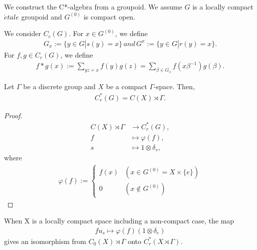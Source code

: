We construct the C*-algebra from a groupoid.
We assume $G$ is a locally compact $\acute{e}tale$ groupoid and $G^{(0)}$ is compact open.

We consider $C_c(G)$.
For $x \in G^{(0)}$, we define
\begin{align*}
  G_x := \{y \in G|s(y)=x\} \,and\, G^x := \{y \in G|r(y)=x\}.
\end{align*}
For $f ,g \in C_c(G)$, we define
\begin{align*}
  f*g(x) := \sum_{yz = x}f(y)g(z) = \sum_{\beta \in G_x}f(x\beta^{-1})g(\beta).
\end{align*}

\begin{proposition}
  Let $\Gamma$ be a discrete group and $X$ be a compact $\Gamma$-space.
  Then,
  \begin{align*}
    C_r^*(G) = C(X)\rtimes\Gamma.
  \end{align*}
\end{proposition}

\begin{proof}
  \begin{align*}
    C(X)\rtimes\Gamma &\rightarrow C_r^*(G),\\
    f &\mapsto \varphi(f),\\
    s &\mapsto 1\otimes \delta_s,
  \end{align*}
  where
  \begin{align*}
    \varphi(f) := 
    \begin{cases}
      f(x) & (x \in G^{(0)}=X\times\{e\})\\
      0 & (x \notin G^{(0)})
    \end{cases}
  \end{align*}
\end{proof}

\begin{remark}
  When X is a locally compact space including a non-compact case,
  the map
  \begin{align*}
    fu_s \mapsto \varphi(f)(1\otimes \delta_e)
  \end{align*}
  gives an isomorphism from $C_0(X)\rtimes \Gamma$ onto $C_r^*(X\rtimes\Gamma)$.
\end{remark}

